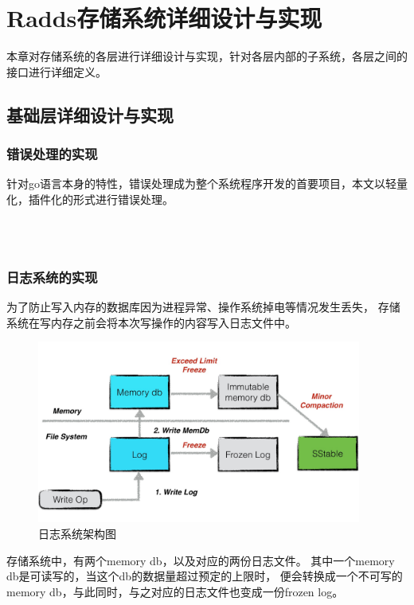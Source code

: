 \section{Radds存储系统详细设计与实现}

	本章对存储系统的各层进行详细设计与实现，针对各层内部的子系统，各层之间的接口进行详细定义。

	\subsection{基础层详细设计与实现}
	
   		\subsubsection{错误处理的实现}

		针对go语言本身的特性，错误处理成为整个系统程序开发的首要项目，本文以轻量化，插件化的形式进行错误处理。
	
		\begin{lstlisting}[caption=Errors , label=code_radds_errors]

 
		\end{lstlisting}                 

	
			
   		\subsubsection{日志系统的实现}
    
	   	为了防止写入内存的数据库因为进程异常、操作系统掉电等情况发生丢失，
	   	存储系统在写内存之前会将本次写操作的内容写入日志文件中。
    
    	\begin{figure}[H]
    		\centering
    		\includegraphics[width=0.95\textwidth]{images/two_log}
    		\caption{日志系统架构图}
    		\label{two_log}
    	\end{figure}
		存储系统中，有两个memory db，以及对应的两份日志文件。
		其中一个memory db是可读写的，当这个db的数据量超过预定的上限时，
		便会转换成一个不可写的memory db，与此同时，与之对应的日志文件也变成一份frozen log。


